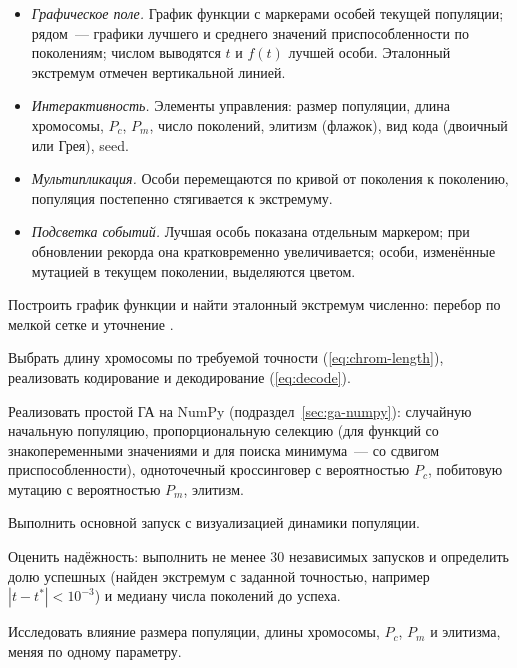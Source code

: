 \begin{itemize}
\item \emph{Графическое поле.} График функции с маркерами особей текущей популяции; рядом~--- графики лучшего и среднего значений приспособленности по поколениям; числом выводятся $t$ и $f(t)$ лучшей особи. Эталонный экстремум отмечен вертикальной линией.
\item \emph{Интерактивность.} Элементы управления: размер популяции, длина хромосомы, $P_c$, $P_m$, число поколений, элитизм (флажок), вид кода (двоичный или Грея), seed.
\item \emph{Мультипликация.} Особи перемещаются по кривой от поколения к поколению, популяция постепенно стягивается к экстремуму.
\item \emph{Подсветка событий.} Лучшая особь показана отдельным маркером; при обновлении рекорда она кратковременно увеличивается; особи, изменённые мутацией в текущем поколении, выделяются цветом.
\end{itemize}

\begin{steps}
\item Построить график функции и найти эталонный экстремум численно: перебор по мелкой сетке
 и уточнение .
\item Выбрать длину хромосомы по требуемой точности (\ref{eq:chrom-length}), реализовать кодирование и
декодирование (\ref{eq:decode}).
\item Реализовать простой ГА на NumPy (подраздел~\ref{sec:ga-numpy}): случайную начальную популяцию, пропорциональную селекцию (для функций со
знакопеременными значениями и для поиска минимума~--- со сдвигом приспособленности), одноточечный
кроссинговер с вероятностью $P_c$, побитовую мутацию с вероятностью $P_m$, элитизм.
\item Выполнить основной запуск с визуализацией динамики популяции.
\item Оценить надёжность: выполнить не менее 30 независимых запусков и определить долю успешных
(найден экстремум с заданной точностью, например $|t - t^*| < 10^{-3}$) и медиану числа поколений до
успеха.
\item Исследовать влияние размера популяции, длины хромосомы, $P_c$, $P_m$ и элитизма, меняя по одному
параметру.
\end{steps}

